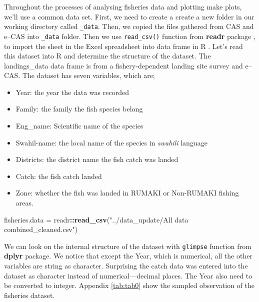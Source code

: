 \documentclass[
  12pt,
  a4paper,
  oneside]{book}
\newenvironment{Shaded}{\begin{snugshade}}{\end{snugshade}}
\newcommand{\KeywordTok}[1]{\textcolor[rgb]{0.13,0.29,0.53}{\textbf{#1}}}
\newcommand{\NormalTok}[1]{#1}
\newcommand{\OperatorTok}[1]{\textcolor[rgb]{0.81,0.36,0.00}{\textbf{#1}}}
\newcommand{\StringTok}[1]{\textcolor[rgb]{0.31,0.60,0.02}{#1}}
\providecommand{\tightlist}{%
  \setlength{\itemsep}{0pt}\setlength{\parskip}{0pt}}
\begin{document}
Throughout the processes of analysing fisheries data and plotting make plots, we'll use a common data set. First, we need to create a create a new folder in our working directory called \texttt{\_data}. Then, we copied the files gathered from CAS and e--CAS into \texttt{\_data} folder. Then we use \texttt{read\_csv()} function from \textbf{readr} package \citep{readr}, to import the sheet in the Excel spreadsheet into data frame in R \citep{R-base}. Let's read this dataset into R and determine the structure of the dataset. The landings\_data data frame is from a fishery-dependent landing site survey and e--CAS. The dataset has seven variables, which are;

\begin{itemize}
\tightlist
\item
  Year: the year the data was recorded
\item
  Family: the family the fish species belong
\item
  Eng\_name: Scientific name of the species
\item
  Swahil-name: the local name of the species in \emph{swahili} language
\item
  Districts: the district name the fish catch was landed
\item
  Catch: the fish catch landed
\item
  Zone: whether the fish was landed in RUMAKI or Non-RUMAKI fishing areas.
\end{itemize}

\begin{Shaded}
\begin{Highlighting}[]
\NormalTok{fisheries.data =}\StringTok{ }\NormalTok{readr}\OperatorTok{::}\KeywordTok{read_csv}\NormalTok{(}\StringTok{"../data_update/All data combined_cleaned.csv"}\NormalTok{)}
\end{Highlighting}
\end{Shaded}

We can look on the internal structure of the dataset with \texttt{glimpse} function from \textbf{dplyr} package. We notice that except the Year, which is numerical, all the other variables are string as character. Surprising the catch data was entered into the dataset as character instead of numerical---decimal places. The Year also need to be converted to integer. Appendix \ref{tab:tab0} show the sampled observation of the fisheries dataset.

\begin{Shaded}
\end{Shaded}
\end{document}
